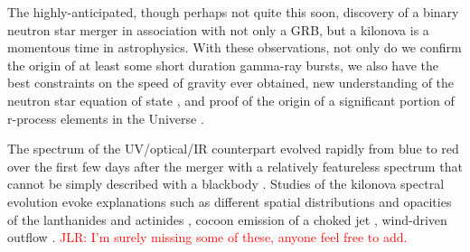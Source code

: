 \documentclass[modern]{aastex61}
\newcommand{\red}[1]{\textcolor{red}{#1}}
\begin{document}

The highly-anticipated, though perhaps not quite this soon, discovery of a binary neutron star merger in association with not only a GRB, but a kilonova is a momentous time in astrophysics.  With these observations, not only do we confirm the origin of at least some short duration gamma-ray bursts, we also have the best constraints on the speed of gravity ever obtained, new understanding of the neutron star equation of state \citep{Abbott2017c}, and proof of the origin of a significant portion of r-process elements in the Universe \citep{Chornock2017,Drout2017,Pian2017,Tanvir2017}.

The spectrum of the UV/optical/IR counterpart evolved rapidly from blue to red over the first few days after the merger with a relatively featureless spectrum that cannot be simply described with a blackbody \citep{McCully2017}.  Studies of the kilonova spectral evolution evoke explanations such as different spatial distributions and opacities of the lanthanides and actinides \citep{McCully2017,Cowperthwaite2017}, cocoon emission of a choked jet \citep{Kasliwal2017}, wind-driven outflow \citep{Evans2017}. \red{JLR: I'm surely missing some of these, anyone feel free to add.}
\end{document}
